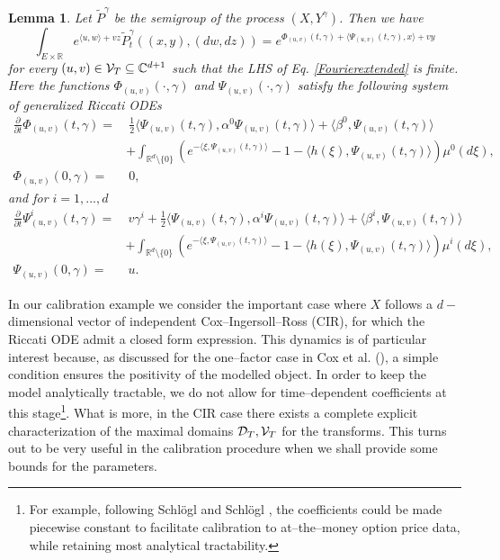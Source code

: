 \documentclass[12pt,a4paper]{article}
\renewcommand{\cite}{\citeyear}
\theoremstyle{plain}
\newtheorem{lemma}{Lemma}[section]%
\numberwithin{equation}{section}
\begin{document}
\begin{lemma}\label{lem:lemmaRiccatiXY}
Let $\tilde{P}^{\gamma}$ be the semigroup of the process $ (X,Y^{\gamma})$. Then we have
\begin{equation}
\int_{E \times \mathbb{R}} e^{\langle u ,w\rangle + vz} \tilde{P}^{\gamma}_t((x,y),(dw,dz))
=e^{ \Phi_{(u,v)}(t,\gamma) +\langle\Psi_{(u,v)}(t,\gamma), x\rangle + v y}\label{Fourierextended}
\end{equation}
for every $(u,v)\in {\cal V}_T\subseteq \mathbb{C}^{d+1}$ such that the LHS of Eq. \eqref{Fourierextended} is finite. Here the functions $\Phi_{(u,v)}(\cdot,\gamma)$ and $\Psi_{(u,v)}(\cdot,\gamma)$ satisfy the following system of generalized Riccati ODEs
\begin{align}
\frac{\partial}{\partial t} \Phi_{(u,v)}(t,\gamma)= & \  \frac{1}{2}\langle \Psi_{(u,v)}(t,\gamma),\alpha^0\Psi_{(u,v)}(t,\gamma)
 \rangle+\langle \beta^0,\Psi_{(u,v)}(t,\gamma) \rangle \nonumber\\
 & +\int_{\mathbb{R}^d\setminus \{ 0\}}
\left(e^{- \langle\xi, \Psi_{(u,v)}(t,\gamma)\rangle}-1-\langle h(\xi),\Psi_{(u,v)}(t,\gamma) \rangle\right)\mu^0(d\xi),\label{riccatiPhi}\\
\Phi_{(u,v)}(0,\gamma) =& \ 0,\nonumber
\end{align}
and for $i=1,...,d$
\begin{align}
\frac{\partial}{\partial t} \Psi^i_{(u,v)}(t,\gamma) =& \ v\gamma^i + \frac{1}{2}\langle\Psi_{(u,v)}(t,\gamma) ,\alpha^i \Psi_{(u,v)}(t,\gamma)
 \rangle+\langle\beta^i,\Psi_{(u,v)}(t,\gamma) \rangle \nonumber\\
& + \int_{\mathbb{R}^d\setminus \{ 0\}}\left(e^{- \langle\xi, \Psi_{(u,v)}(t,\gamma)\rangle}-1-\langle h(\xi),\Psi_{(u,v)}(t,\gamma)\rangle\right)\mu^i (d\xi),\label{riccatiPsi}\\
\Psi_{(u,v)}(0,\gamma) =& \ u.\nonumber
\end{align}
\end{lemma}


In our calibration example we consider the important case where $X$ follows a $d-$ dimensional vector of independent Cox--Ingersoll--Ross (CIR), for which the Riccati ODE admit a closed form expression. This  dynamics is of particular interest because,  as discussed for the one--factor case in Cox et al. (\citeyear*{CIR1985}),  a simple condition ensures the positivity of the modelled object. In order to keep the model analytically tractable, we do not allow for time--dependent coefficients at this stage\footnote{For example, following Schl\"ogl and Schl\"ogl \cite{OZ:Sch&Sch:00}, the coefficients could be made piecewise constant to facilitate calibration to at--the--money option price data, while retaining most analytical tractability.}. What is more, in the CIR case there exists a complete explicit characterization of the maximal domains ${\cal D}_T,{\cal V}_T$ for the transforms. This turns out to be very useful in the calibration procedure when we shall provide some bounds for the parameters.
\end{document}
